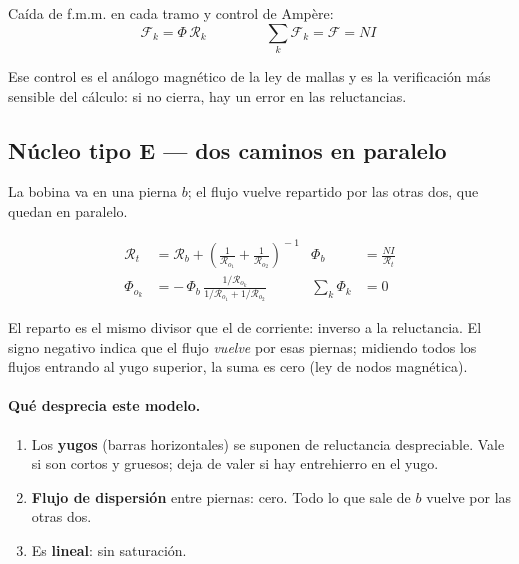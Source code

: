 \documentclass[11pt,a4paper]{article}
\newcommand{\Rel}{\mathcal{R}}          %
\newcommand{\fmm}{\mathcal{F}}          %
\begin{document}
\noindent Caída de f.m.m. en cada tramo y control de Ampère:
\begin{equation}
  \fmm_k = \Phi\,\Rel_k
  \qquad\qquad
  \boxed{\ \sum_k \fmm_k = \fmm = NI \ }
\end{equation}

\noindent Ese control es el análogo magnético de la ley de mallas y es la verificación más
sensible del cálculo: si no cierra, hay un error en las reluctancias.

\subsection{Núcleo tipo E — dos caminos en paralelo}

\begin{center}
\end{center}

La bobina va en una pierna $b$; el flujo vuelve repartido por las otras dos, que quedan en
paralelo.

\begin{align}
  \Rel_t &= \Rel_b + \left(\frac{1}{\Rel_{o_1}} + \frac{1}{\Rel_{o_2}}\right)^{\!-1}
  & \Phi_b &= \frac{N I}{\Rel_t} \\[2mm]
  \Phi_{o_k} &= -\,\Phi_b\,\frac{1/\Rel_{o_k}}{1/\Rel_{o_1}+1/\Rel_{o_2}}
  & \sum_k \Phi_k &= 0
\end{align}

\noindent El reparto es el mismo divisor que el de corriente: inverso a la reluctancia.
El signo negativo indica que el flujo \emph{vuelve} por esas piernas; midiendo todos los
flujos entrando al yugo superior, la suma es cero (ley de nodos magnética).

\paragraph{Qué desprecia este modelo.}
\begin{enumerate}[nosep,leftmargin=*]
  \item Los \textbf{yugos} (barras horizontales) se suponen de reluctancia despreciable.
        Vale si son cortos y gruesos; deja de valer si hay entrehierro en el yugo.
  \item \textbf{Flujo de dispersión} entre piernas: cero. Todo lo que sale de $b$ vuelve
        por las otras dos.
  \item Es \textbf{lineal}: sin saturación.
\end{enumerate}
\end{document}
